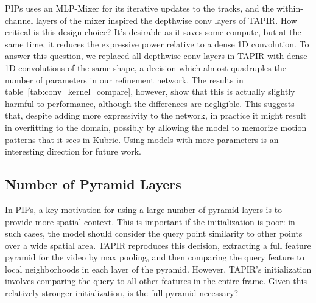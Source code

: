 \documentclass[10pt,twocolumn,letterpaper]{article}
\begin{document}
PIPs uses an MLP-Mixer for its iterative updates to the tracks, and the within-channel layers of the mixer inspired the depthwise conv layers of TAPIR.  How critical is this design choice?  It's desirable as it saves some compute, but at the same time, it reduces the expressive power relative to a dense 1D convolution.  To answer this question, we replaced all depthwise conv layers in TAPIR with dense 1D convolutions of the same shape, a decision which almost quadruples the number of parameters in our refinement network.  The results in table~\ref{tab:conv_kernel_compare}, however, show that this is actually slightly harmful to performance, although the differences are negligible.  This suggests that, despite adding more expressivity to the network, in practice it might result in overfitting to the domain, possibly by allowing the model to memorize motion patterns that it sees in Kubric.  Using models with more parameters is an interesting direction for future work.

\begin{table}[t]
\caption{\textbf{Comparison on number of feature pyramid levels.} We find that the number of pyramid levels makes relatively little difference in performance; in fact, 3 pyramid levels seems to be all that's required, and even 2 levels gives competitive performance.}
\label{tab:pyramid_level_compare}
\end{table}

\subsection{Number of Pyramid Layers}
\label{sec:pyramid_layers}
In PIPs, a key motivation for using a large number of pyramid layers is to provide more spatial context.  This is important if the initialization is poor: in such cases, the model should consider the query point similarity to other points over a wide spatial area.  TAPIR reproduces this decision, extracting a full feature pyramid for the video by max pooling, and then comparing the query feature to local neighborhoods in each layer of the pyramid.  However, TAPIR's initialization involves comparing the query to all other features in the entire frame.  Given this relatively stronger initialization, is the full pyramid necessary?  
\end{document}
